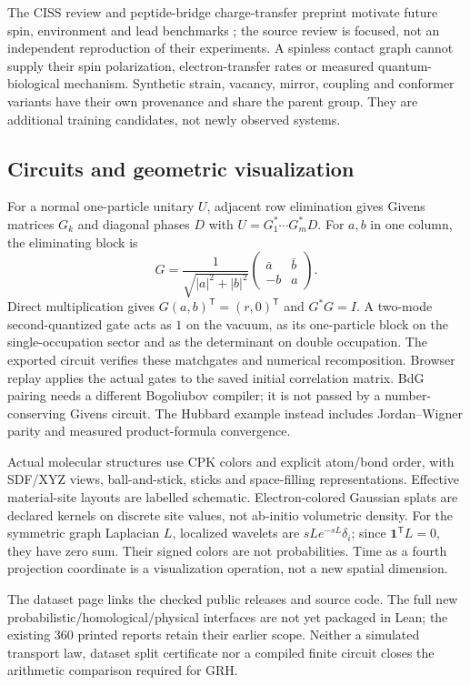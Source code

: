 The CISS review and peptide-bridge charge-transfer preprint motivate future
spin, environment and lead benchmarks \cite{DSCISS,DSBridge}; the source review is
focused, not an independent reproduction of their experiments. A spinless
contact graph cannot supply their spin polarization, electron-transfer rates
or measured quantum-biological mechanism. Synthetic strain, vacancy, mirror,
coupling and conformer variants have their own provenance and share the parent
group. They are additional training candidates, not newly observed systems.

\subsection{Circuits and geometric visualization}
For a normal one-particle unitary $U$, adjacent row elimination gives Givens
matrices $G_k$ and diagonal phases $D$ with
$U=G_1^*\cdots G_m^*D$. For $a,b$ in one column, the eliminating block is
\[
 G=\frac1{\sqrt{|a|^2+|b|^2}}
 \begin{pmatrix}\bar a&\bar b\\-b&a\end{pmatrix}.
\]
Direct multiplication gives $G(a,b)^{\mathsf T}=(r,0)^{\mathsf T}$ and
$G^*G=I$. A two-mode second-quantized gate acts as $1$ on the vacuum, as its
one-particle block on the single-occupation sector and as the determinant on
double occupation. The exported circuit verifies these matchgates and numerical
recomposition. Browser replay applies the actual gates to the saved initial
correlation matrix. BdG pairing needs a different Bogoliubov compiler; it is
not passed by a number-conserving Givens circuit. The Hubbard example instead
includes Jordan--Wigner parity and measured product-formula convergence.

Actual molecular structures use CPK colors and explicit atom/bond order, with
SDF/XYZ views, ball-and-stick, sticks and space-filling representations.
Effective material-site layouts are labelled schematic. Electron-colored
Gaussian splats are declared kernels on discrete site values, not ab-initio
volumetric density. For the symmetric graph Laplacian $L$, localized wavelets
are $sLe^{-sL}\delta_i$; since $\mathbf1^{\mathsf T}L=0$, they have zero sum.
Their signed colors are not probabilities. Time as a fourth projection
coordinate is a visualization operation, not a new spatial dimension.

The dataset page links the checked public releases and source code. The full
new probabilistic/homological/physical interfaces are not yet packaged in Lean;
the existing $360$ printed reports retain their earlier scope. Neither a simulated
transport law, dataset split certificate nor a compiled finite circuit closes
the arithmetic comparison required for GRH.
